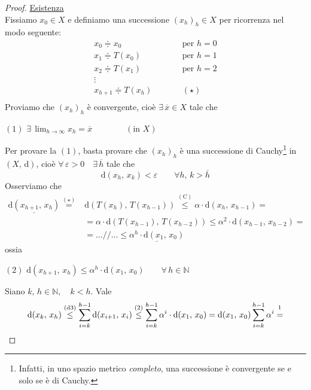 \begin{proof}
\noindent\underline{Esistenza}\\
Fissiamo $x_0 \in X$ e definiamo una successione $(x_h)_h \in X$ per ricorrenza nel modo seguente:
$$
\begin{array}{lcr}
x_0 \doteqdot x_0 & \qquad & \text{per } h=0\\
x_1 \doteqdot T(x_0) & \qquad & \text{per } h=1\\
x_2 \doteqdot T(x_1) & \qquad & \text{per } h=2\\
\vdots & & \\
x_{h+1} \doteqdot T(x_h) & \qquad & (\star)\\
\end{array}
$$
Proviamo che $(x_h)_h$ è convergente, cioè $\exists \, \overline{x} \in X$ tale che
\begin{center}
$\mathrm{(1)}$
\hfill
$\displaystyle
\exists \, \lim_{h \rightarrow \infty} x_h = \overline{x} \qquad\qquad (\text{in } X)
$
\hfill \null \\
\end{center}
Per provare la $\mathrm{(1)}$, basta provare che $(x_h)_h$ è una successione di Cauchy\footnote{Infatti, in uno spazio metrico \emph{completo}, una successione è convergente se e solo se è di Cauchy.} in $(X,\,\mathrm{d})$, cioè $\forall \, \varepsilon > 0 \quad \exists \, \overline{h}$ tale che
$$
\mathrm{d}(x_h,\,x_k) < \varepsilon \qquad \forall h,\,k > \overline{h}
$$
Osserviamo che
$$
\begin{array}{rl}
\underline{\mathrm{d}(x_{h+1},\,x_h)} \overset{\mathrm{(\star)}}{=} & 
\mathrm{d}\left( T(x_h),\,T(x_{h-1}) \right) \overset{\mathrm{(C)}}{\leq}
\alpha \cdot \mathrm{d}(x_h,\,x_{h-1}) =\\
& = \alpha \cdot \mathrm{d}\left( T(x_{h-1}),\,T(x_{h-2}) \right) \leq
\alpha^2 \cdot \mathrm{d}(x_{h-1},\,x_{h-2}) =\\
& = \ldots//\ldots \leq \underline{\alpha^h \cdot \mathrm{d}(x_1,\,x_0)}
\end{array}
$$
ossia
\begin{center}
$\mathrm{(2)}$
\hfill
$\displaystyle
\mathrm{d}(x_{h+1},\,x_h) \leq \alpha^h \cdot \mathrm{d}(x_1,\,x_0) \qquad \forall \, h \in \mathbb{N}
$
\hfill \null \\
\end{center}
Siano $k,\,h \in \mathbb{N}, \quad k < h$. Vale
$$
\mathrm{d}(x_k,\,x_h) \overset{\mathrm{(d3)}}{\leq} 
\sum_{i=k}^{h-1} \mathrm{d}(x_{i+1},\,x_i) \overset{\mathrm{(2)}}{\leq}
\sum_{i=k}^{h-1} \alpha^i \cdot \mathrm{d}(x_1,\,x_0) =
\mathrm{d}(x_1,\,x_0) \sum_{i=k}^{h-1} \alpha^i \overset{\footnotemark}{=}
$$
\end{proof}
